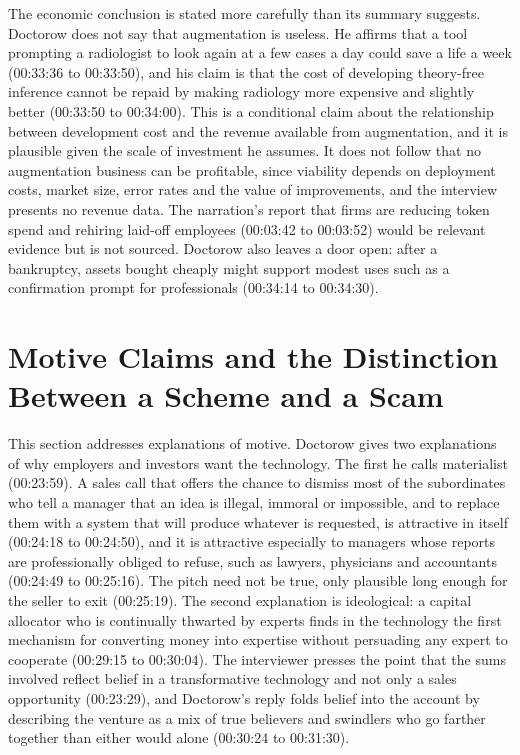 \documentclass[12pt]{article}
\newcommand{\ts}[1]{(#1)}
\begin{document}
The economic conclusion is stated more carefully than its summary suggests. Doctorow does not say that augmentation is useless. He affirms that a tool prompting a radiologist to look again at a few cases a day could save a life a week \ts{00:33:36 to 00:33:50}, and his claim is that the cost of developing theory-free inference cannot be repaid by making radiology more expensive and slightly better \ts{00:33:50 to 00:34:00}. This is a conditional claim about the relationship between development cost and the revenue available from augmentation, and it is plausible given the scale of investment he assumes. It does not follow that no augmentation business can be profitable, since viability depends on deployment costs, market size, error rates and the value of improvements, and the interview presents no revenue data. The narration's report that firms are reducing token spend and rehiring laid-off employees \ts{00:03:42 to 00:03:52} would be relevant evidence but is not sourced. Doctorow also leaves a door open: after a bankruptcy, assets bought cheaply might support modest uses such as a confirmation prompt for professionals \ts{00:34:14 to 00:34:30}.

\section{Motive Claims and the Distinction Between a Scheme and a Scam}

This section addresses explanations of motive. Doctorow gives two explanations of why employers and investors want the technology. The first he calls materialist \ts{00:23:59}. A sales call that offers the chance to dismiss most of the subordinates who tell a manager that an idea is illegal, immoral or impossible, and to replace them with a system that will produce whatever is requested, is attractive in itself \ts{00:24:18 to 00:24:50}, and it is attractive especially to managers whose reports are professionally obliged to refuse, such as lawyers, physicians and accountants \ts{00:24:49 to 00:25:16}. The pitch need not be true, only plausible long enough for the seller to exit \ts{00:25:19}. The second explanation is ideological: a capital allocator who is continually thwarted by experts finds in the technology the first mechanism for converting money into expertise without persuading any expert to cooperate \ts{00:29:15 to 00:30:04}. The interviewer presses the point that the sums involved reflect belief in a transformative technology and not only a sales opportunity \ts{00:23:29}, and Doctorow's reply folds belief into the account by describing the venture as a mix of true believers and swindlers who go farther together than either would alone \ts{00:30:24 to 00:31:30}.
\end{document}
